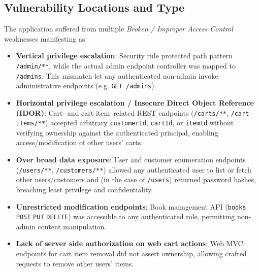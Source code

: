 \documentclass[]{UCD_CS_FYP_Report}
\begin{document}
\subsection*{Vulnerability Locations and Type}
The application suffered from multiple \textit{Broken / Improper Access Control} weaknesses manifesting as:
\begin{itemize}
	\item \textbf{Vertical privilege escalation}: Security rule protected path pattern \texttt{/admin/**}, while the actual admin endpoint controller was mapped to \texttt{/admins}. This mismatch let any authenticated non-admin invoke administrative endpoints (e.g. \texttt{GET /admins}).
	\item \textbf{Horizontal privilege escalation / Insecure Direct Object Reference (IDOR)}: Cart- and cart-item–related REST endpoints (\texttt{/carts/**}, \texttt{/cart-items/**}) accepted arbitrary \texttt{customerId}, \texttt{cartId}, or \texttt{itemId} without verifying ownership against the authenticated principal, enabling access/modification of other users' carts.
	\item \textbf{Over broad data exposure}: User and customer enumeration endpoints (\texttt{/users/**}, \texttt{/customers/**}) allowed any authenticated user to list or fetch other users/customers and (in the case of \texttt{/users}) returned password hashes, breaching least privilege and confidentiality.
	\item \textbf{Unrestricted modification endpoints}: Book management API (\texttt{books} \texttt{POST} \texttt{PUT} \texttt{DELETE}) was accessible to any authenticated role, permitting non-admin content manipulation.
	\item \textbf{Lack of server side authorization on web cart actions}: Web MVC endpoints for cart item removal did not assert ownership, allowing crafted requests to remove other users' items.
\end{itemize}
\end{document}
